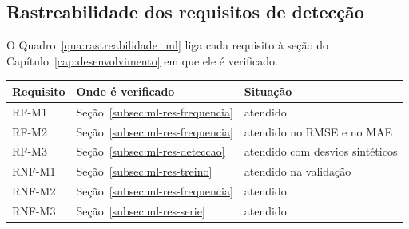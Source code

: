 \subsection{Rastreabilidade dos requisitos de detecção}

O Quadro~\ref{qua:rastreabilidade_ml} liga cada requisito à seção do
Capítulo~\ref{cap:desenvolvimento} em que ele é verificado.

\begin{quadro}[htb]
	\centering
	\caption{Rastreabilidade dos requisitos do modelo de detecção}
	\label{qua:rastreabilidade_ml}
	\begin{tabular}{lll}
		\hline
		\textbf{Requisito} & \textbf{Onde é verificado} & \textbf{Situação} \\
		\hline
		RF-M1 & Seção~\ref{subsec:ml-res-frequencia} & atendido \\
		RF-M2 & Seção~\ref{subsec:ml-res-frequencia} & atendido no RMSE e no MAE \\
		RF-M3 & Seção~\ref{subsec:ml-res-deteccao} & atendido com desvios sintéticos \\
		RNF-M1 & Seção~\ref{subsec:ml-res-treino} & atendido na validação \\
		RNF-M2 & Seção~\ref{subsec:ml-res-frequencia} & atendido \\
		RNF-M3 & Seção~\ref{subsec:ml-res-serie} & atendido \\
		\hline
	\end{tabular}
\end{quadro}
